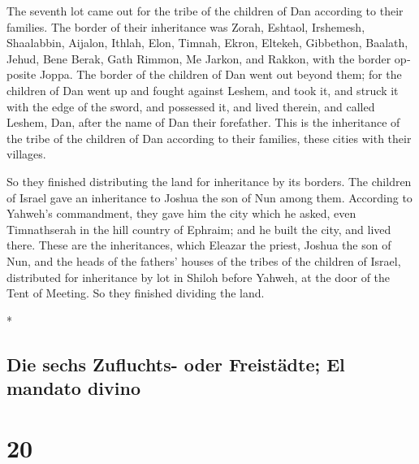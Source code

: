 \begin{paracol}{2}
\begin{otherlanguage}{english}
 The seventh lot came out for the tribe of the children
of Dan according to their families.  The border of their
inheritance was Zorah, Eshtaol, Irshemesh,  Shaalabbin,
Aijalon, Ithlah,  Elon, Timnah, Ekron, 
Eltekeh, Gibbethon, Baalath,  Jehud, Bene Berak, Gath
Rimmon,  Me Jarkon, and Rakkon, with the border opposite
Joppa.  The border of the children of Dan went out beyond
them; for the children of Dan went up and fought against Leshem, and
took it, and struck it with the edge of the sword, and possessed it, and
lived therein, and called Leshem, Dan, after the name of Dan their
forefather.  This is the inheritance of the tribe of the
children of Dan according to their families, these cities with their
villages.

 So they finished distributing the land for inheritance
by its borders. The children of Israel gave an inheritance to Joshua the
son of Nun among them.  According to Yahweh's
commandment, they gave him the city which he asked, even Timnathserah in
the hill country of Ephraim; and he built the city, and lived there.
 These are the inheritances, which Eleazar the priest,
Joshua the son of Nun, and the heads of the fathers' houses of the
tribes of the children of Israel, distributed for inheritance by lot in
Shiloh before Yahweh, at the door of the Tent of Meeting. So they
finished dividing the land.

\end{otherlanguage}

\switchcolumn[0]*

\hypertarget{die-sechs-zufluchts--oder-freistuxe4dte-el-mandato-divino}{%
\subsection{Die sechs Zufluchts- oder Freistädte; El mandato
divino}\label{die-sechs-zufluchts--oder-freistuxe4dte-el-mandato-divino}}

\hypertarget{section-38}{%
\section{20}\label{section-38}}


\end{paracol}
